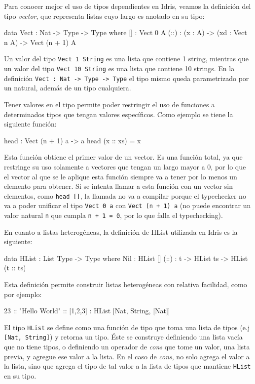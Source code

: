 Para conocer mejor el uso de tipos dependientes en Idris, veamos la definición del tipo \textit{vector}, que representa listas cuyo largo es anotado en su tipo:

\begin{code}
data Vect : Nat -> Type -> Type where
  [] : Vect 0 A
  (::) : (x : A) -> (xd : Vect n A) -> Vect (n + 1) A
\end{code}

Un valor del tipo \texttt{Vect 1 String} es una lista que contiene 1 string, mientras que un valor del tipo \texttt{Vect 10 String} es una lista que contiene 10 strings. En la definición \texttt{Vect : Nat -> Type -> Type} el tipo mismo queda parametrizado por un natural, además de un tipo cualquiera.

Tener valores en el tipo permite poder restringir el uso de funciones a determinados tipos que tengan valores específicos. Como ejemplo se tiene la siguiente función:

\begin{code}
head : Vect (n + 1) a -> a
head (x :: xs) = x
\end{code}

Esta función obtiene el primer valor de un vector. Es una función total, ya que restringe su uso solamente a vectores que tengan un largo mayor a 0, por lo que el vector al que se le aplique esta función siempre va a tener por lo menos un elemento para obtener. Si se intenta llamar a esta función con un vector sin elementos, como \texttt{head []}, la llamada no va a compilar porque el typechecker no va a poder unificar el tipo \texttt{Vect 0 a} con \texttt{Vect (n + 1) a} (no puede encontrar un valor natural \texttt{n} que cumpla \texttt{n + 1 = 0}, por lo que falla el typechecking).

En cuanto a listas heterogéneas, la definición de HList utilizada en Idris es la siguiente:

\begin{code}
data HList : List Type -> Type where
  Nil : HList []
  (::) : t -> HList ts -> HList (t :: ts)
\end{code}

Esta definición permite construir listas heterogéneas con relativa facilidad, como por ejemplo:

\begin{code}
23 :: "Hello World" :: [1,2,3] :
  HList [Nat, String, [Nat]]
\end{code}

El tipo \texttt{HList} se define como una función de tipo que toma una lista de tipos (e.j \texttt{[Nat, String]}) y retorna un tipo. Éste se construye definiendo una lista vacía que no tiene tipos, o definiendo un operador de \textit{cons} que tome un valor, una lista previa, y agregue ese valor a la lista. En el caso de \textit{cons}, no solo agrega el valor a la lista, sino que agrega el tipo de tal valor a la lista de tipos que mantiene \texttt{HList} en su tipo.

